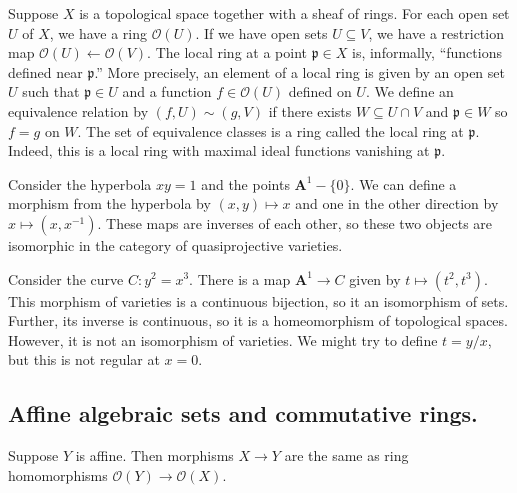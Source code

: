 \documentclass [11 pt, oneside] {article}
\begin{document}
Suppose $X$ is a topological space together with a sheaf of rings. For each open set $U$ of $X$, we have a ring $\mathscr{O}(U)$. If we have open sets $U\subseteq V$, we have a restriction map $\mathscr{O} (U)  \longleftarrow \mathscr{O}(V)$. The local ring at a point $\mathfrak{p}\in X$ is, informally, ``functions defined near $\mathfrak{p}$.'' More precisely, an element of a local ring is given by an open set $U$ such that $\mathfrak{p}\in U$ and a function $f\in \mathscr{O}(U)$ defined on $U$. We define an equivalence relation by $(f,U)\sim  (g,V)$ if there exists $W\subseteq U\cap V$ and $\mathfrak{p}\in W$  so $f=g$ on $W$. The set of equivalence classes is a ring called the local ring at $\mathfrak{p}$. Indeed, this is a local ring with maximal ideal functions vanishing at $\mathfrak{p}$.

\begin{example}[ ]\label{}
Consider the hyperbola $xy=1$ and the points $\mathbf{A}^1-\{0\}$. We can define a morphism from the hyperbola by $(x,y)\longmapsto x$ and one in the other direction by $x\longmapsto (x,x^{-1})$. These maps are inverses of each other, so these two objects are isomorphic in the category of quasiprojective varieties.
\end{example}

\begin{example}[ ]\label{}
Consider the curve $C: y^2=x^3$. There is a map $\mathbf{A}^1\longrightarrow C$ given by $t\longmapsto (t^2,t^3)$. This morphism of varieties is a continuous bijection, so it an isomorphism of sets. Further, its inverse is continuous, so it is a homeomorphism of topological spaces. However, it is not an isomorphism of varieties. We might try to define $t = y/x$, but this is not regular at $x=0$.
\end{example}

\subsection{Affine algebraic sets and commutative rings.}
\begin{theorem}[ ]\label{}\index{}
Suppose $Y$ is affine. Then morphisms $X\longrightarrow Y$ are the same as ring homomorphisms $\mathscr{O}(Y)  \longrightarrow \mathscr{O}(X)$.
\end{theorem}
\end{document}
